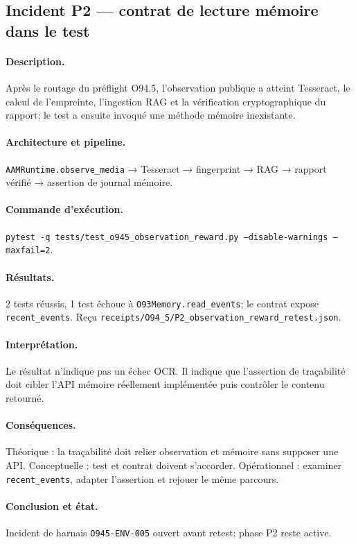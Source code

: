 \documentclass[11pt,a4paper]{article}
\begin{document}
\subsection{Incident P2 — contrat de lecture mémoire dans le test}
\paragraph{Description.} Après le routage du préflight O94.5, l'observation publique a atteint Tesseract, le calcul de l'empreinte, l'ingestion RAG et la vérification cryptographique du rapport; le test a ensuite invoqué une méthode mémoire inexistante.
\paragraph{Architecture et pipeline.} \texttt{AAMRuntime.observe\_media} → Tesseract → fingerprint → RAG → rapport vérifié → assertion de journal mémoire.
\paragraph{Commande d'exécution.} \texttt{pytest -q tests/test\_o945\_observation\_reward.py --disable-warnings --maxfail=2}.
\paragraph{Résultats.} 2 tests réussis, 1 test échoue à \texttt{O93Memory.read\_events}; le contrat expose \texttt{recent\_events}. Reçu \texttt{receipts/O94\_5/P2\_observation\_reward\_retest.json}.
\paragraph{Interprétation.} Le résultat n'indique pas un échec OCR. Il indique que l'assertion de traçabilité doit cibler l'API mémoire réellement implémentée puis contrôler le contenu retourné.
\paragraph{Conséquences.} Théorique : la traçabilité doit relier observation et mémoire sans supposer une API. Conceptuelle : test et contrat doivent s'accorder. Opérationnel : examiner \texttt{recent\_events}, adapter l'assertion et rejouer le même parcours.
\paragraph{Conclusion et état.} Incident de harnais \texttt{O945-ENV-005} ouvert avant retest; phase P2 reste active.
\end{document}
